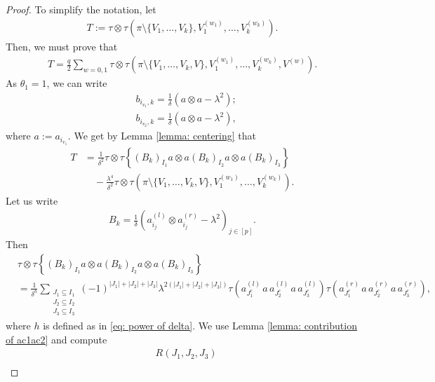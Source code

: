 \documentclass[10pt,a4paper]{amsart}
\begin{document}
\begin{proof}
    To simplify the notation, let
    \begin{align*}
        T:=\tau\otimes\tau \left(\pi\setminus \{V_1,\ldots,V_{k}\},V_1^{(w_1)},\ldots,V_{k}^{(w_{k})}\right).
    \end{align*}
    Then, we must prove that
    \begin{align*}
        T=\frac{q}{2}\sum_{w=0,1}\tau\otimes\tau \left(\pi\setminus \{V_1,\ldots,V_k,V\},V_1^{(w_1)},\ldots,V_{k}^{(w_{k})},V^{(w)}\right).
    \end{align*}
    As $\theta_1=1$, we can write
    \begin{align*}
        &b_{i_{v_1},k}=\frac{1}{\delta}\left(a\otimes a-\lambda^2\right);\\
        &b_{i_{v_2},k}=\frac{1}{\delta}\left(a\otimes a-\lambda^2\right),
    \end{align*}
    where $a:=a_{i_{v_1}}$. We get by Lemma \ref{lemma: centering} that
    \begin{align}\label{eq: value of T}
        T&=\frac{1}{\delta^2}\tau\otimes \tau\left\{\left(B_k\right)_{I_1}a\otimes a\left(B_k\right)_{I_2}a\otimes a\left(B_k\right)_{I_3}\right\}\nonumber\\
    & \quad -\frac{\lambda^4}{\delta^2}\tau\otimes \tau\left(\pi\setminus\{V_1,\ldots,V_k,V\},V_1^{(w_1)},\ldots,V_k^{(w_k)}\right).
    \end{align}
    Let us write 
    \begin{align*}
        B_k=\frac{1}{\delta}\left(a_{i_j}^{(l)}\otimes a_{i_j}^{(r)}-\lambda^2\right)_{j \in [p]}.
    \end{align*}
    Then
    \begin{align*}
        &\tau\otimes \tau\left\{\left(B_k\right)_{I_1}a\otimes a\left(B_k\right)_{I_2}a\otimes a\left(B_k\right)_{I_3}\right\}\\
        &=\frac{1}{\delta^{h}}\sum_{\substack{J_1 \subseteq I_1\\ J_2 \subseteq I_2\\ J_3 \subseteq I_3}}(-1)^{|J_1|+|J_2|+|J_3|}\lambda^{2(|J_1|+|J_2|+|J_3|)}\tau\left(a_{J_1^c}^{(l)}\, a \, a_{J_2^c}^{(l)}\, a \, a_{J_3^c}^{(l)}\right)\tau\left(a_{J_1^c}^{(r)}\, a \, a_{J_2^c}^{(r)}\, a\, a_{J_3^c}^{(r)}\right),
    \end{align*}
    where $h$ is defined as in \eqref{eq: power of delta}. We use Lemma \ref{lemma: contribution of ac1ac2} and compute
    \begin{align*}
        &R(J_1,J_2,J_3) \\

\end{align*}
\end{proof}
\end{document}
